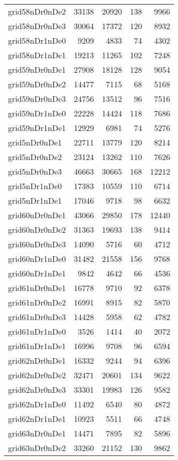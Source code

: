 \begin{longtable}{lrrrr}
grid58nDr0nDe2 & 33138 & 20920 & 138 & 9966 \\
grid58nDr0nDe3 & 30064 & 17372 & 120 & 8932 \\
grid58nDr1nDe0 & 9209 & 4833 & 74 & 4302 \\
grid58nDr1nDe1 & 19213 & 11265 & 102 & 7248 \\
grid59nDr0nDe1 & 27908 & 18128 & 128 & 9054 \\
grid59nDr0nDe2 & 14477 & 7115 & 68 & 5168 \\
grid59nDr0nDe3 & 24756 & 13512 & 96 & 7516 \\
grid59nDr1nDe0 & 22228 & 14424 & 118 & 7686 \\
grid59nDr1nDe1 & 12929 & 6981 & 74 & 5276 \\
grid5nDr0nDe1 & 22711 & 13779 & 120 & 8214 \\
grid5nDr0nDe2 & 23124 & 13262 & 110 & 7626 \\
grid5nDr0nDe3 & 46663 & 30665 & 168 & 12212 \\
grid5nDr1nDe0 & 17383 & 10559 & 110 & 6714 \\
grid5nDr1nDe1 & 17046 & 9718 & 98 & 6632 \\
grid60nDr0nDe1 & 43066 & 29850 & 178 & 12440 \\
grid60nDr0nDe2 & 31363 & 19693 & 138 & 9414 \\
grid60nDr0nDe3 & 14090 & 5716 & 60 & 4712 \\
grid60nDr1nDe0 & 31482 & 21558 & 156 & 9768 \\
grid60nDr1nDe1 & 9842 & 4642 & 66 & 4536 \\
grid61nDr0nDe1 & 16778 & 9710 & 92 & 6378 \\
grid61nDr0nDe2 & 16991 & 8915 & 82 & 5870 \\
grid61nDr0nDe3 & 14428 & 5958 & 62 & 4782 \\
grid61nDr1nDe0 & 3526 & 1414 & 40 & 2072 \\
grid61nDr1nDe1 & 16996 & 9708 & 96 & 6594 \\
grid62nDr0nDe1 & 16332 & 9244 & 94 & 6396 \\
grid62nDr0nDe2 & 32471 & 20601 & 134 & 9622 \\
grid62nDr0nDe3 & 33301 & 19983 & 126 & 9582 \\
grid62nDr1nDe0 & 11492 & 6540 & 80 & 4872 \\
grid62nDr1nDe1 & 10923 & 5511 & 66 & 4748 \\
grid63nDr0nDe1 & 14471 & 7895 & 82 & 5896 \\
grid63nDr0nDe2 & 33260 & 21152 & 130 & 9862 \\

\end{longtable}
